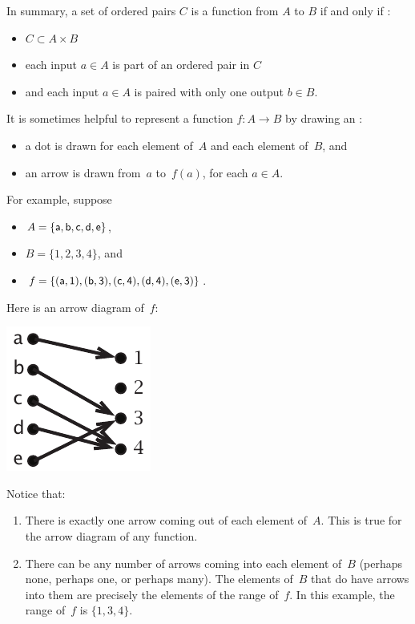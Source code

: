 In summary, a set of ordered pairs $C$ is a function from $A$ to $B$ if and only if :
\begin{itemize}
\item
$C \subset A \times B$
\item
each input $a \in A$ is part of an ordered pair in $C$
\item
and each input $a \in A$ is paired with only one output $b \in B$.
\end{itemize}

It is sometimes helpful to represent a function $f \colon A \to B$ by drawing an : 
\begin{itemize}
\item a dot is drawn for each element of~$A$ and each element of~$B$,
and
\item an arrow is drawn from~$a$ to~$f(a)$, for each $a \in A$.
\end{itemize}
For example, suppose 
\begin{itemize}
\item $A = \{\sf{a}, \sf{b}, \sf{c}, \sf{d}, \sf{e}\}$,
\item $B = \{1, 2, 3, 4\}$,
and
\item $f = \{ (\sf{a},1), (\sf{b}, 3), (\sf{c}, 4), (\sf{d},4), (\sf{e}, 3) \}$.
\end{itemize}
Here is an arrow diagram of~$f$:
\begin{center}
\includegraphics{images/arrowdiageg.pdf}
\end{center}
Notice that:
\begin{enumerate}
\item There is exactly one arrow coming out of each element of~$A$. This is true for the arrow diagram of any function.
\item There can be any number of arrows coming into each element of~$B$ (perhaps none, perhaps one, or perhaps many). The elements of~$B$ that do have arrows into them are precisely the elements of the range of~$f$. In this example, the range of~$f$ is $\{1,3,4\}$.
\end{enumerate}


